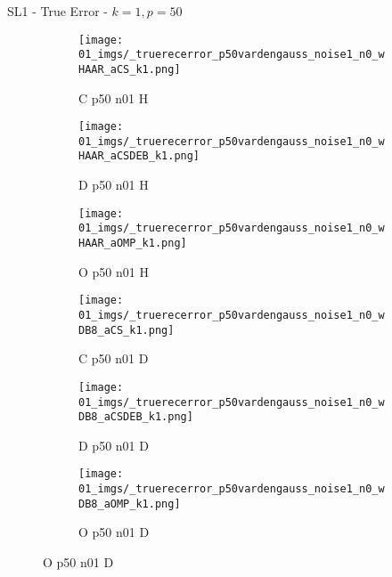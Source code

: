 \begin{frame}{SL1 - True Error - $k=1,p=50$}{}
\begin{figure}
\begin{subfigure}{0.13\textwidth}
\texttt{[image: 01\_imgs/\_truerecerror\_p50vardengauss\_noise1\_n0\_wHAAR\_aCS\_k1.png]}
\caption*{\tiny C p50 n01 H}
\end{subfigure}
\begin{subfigure}{0.13\textwidth}
\texttt{[image: 01\_imgs/\_truerecerror\_p50vardengauss\_noise1\_n0\_wHAAR\_aCSDEB\_k1.png]}
\caption*{\tiny D p50 n01 H}
\end{subfigure}
\begin{subfigure}{0.13\textwidth}
\texttt{[image: 01\_imgs/\_truerecerror\_p50vardengauss\_noise1\_n0\_wHAAR\_aOMP\_k1.png]}
\caption*{\tiny O p50 n01 H}
\end{subfigure}
\begin{subfigure}{0.13\textwidth}
\texttt{[image: 01\_imgs/\_truerecerror\_p50vardengauss\_noise1\_n0\_wDB8\_aCS\_k1.png]}
\caption*{\tiny C p50 n01 D}
\end{subfigure}
\begin{subfigure}{0.13\textwidth}
\texttt{[image: 01\_imgs/\_truerecerror\_p50vardengauss\_noise1\_n0\_wDB8\_aCSDEB\_k1.png]}
\caption*{\tiny D p50 n01 D}
\end{subfigure}
\begin{subfigure}{0.13\textwidth}
\texttt{[image: 01\_imgs/\_truerecerror\_p50vardengauss\_noise1\_n0\_wDB8\_aOMP\_k1.png]}
\caption*{\tiny O p50 n01 D}
\end{subfigure}

\vspace{5pt}


\end{figure}
\end{frame}

